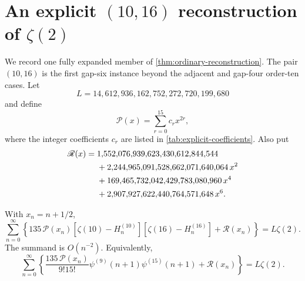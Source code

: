 \section{An explicit \texorpdfstring{$(10,16)$}{(10,16)} reconstruction of \texorpdfstring{$\zeta(2)$}{zeta(2)}}
\label{sec:explicit-identity}

We record one fully expanded member of
\cref{thm:ordinary-reconstruction}.  The pair $(10,16)$ is the first
gap-six instance beyond the adjacent and gap-four order-ten cases.  Let
\begin{equation}
 L=14{,}612{,}936{,}162{,}752{,}272{,}720{,}199{,}680
 \label{eq:explicit-L}
\end{equation}
and define
\begin{equation}
 \mathscr P(x)=\sum_{r=0}^{15}c_rx^{2r},
 \label{eq:explicit-P}
\end{equation}
where the integer coefficients $c_r$ are listed in
\cref{tab:explicit-coefficients}.  Also put
\begin{align}
 \mathscr R(x)={}&
 1{,}552{,}076{,}939{,}623{,}430{,}612{,}844{,}544
 \notag\\
 &+2{,}244{,}965{,}091{,}528{,}662{,}071{,}640{,}064\,x^2
 \notag\\
 &+169{,}465{,}732{,}042{,}429{,}783{,}080{,}960\,x^4
 \notag\\
 &+2{,}907{,}927{,}622{,}440{,}764{,}571{,}648\,x^6.
 \label{eq:explicit-R}
\end{align}

\begin{theorem}
\label{thm:explicit-1016}
With $x_n=n+1/2$,
\begin{equation}
 \boxed{\displaystyle
 \sum_{n=0}^{\infty}
 \left\{
 135\,\mathscr P(x_n)
 [\zeta(10)-H_n^{(10)}][\zeta(16)-H_n^{(16)}]
 +\mathscr R(x_n)
 \right\}=L\zeta(2).}
 \label{eq:explicit-1016}
\end{equation}
The summand is $O(n^{-2})$.  Equivalently,
\begin{equation}
 \sum_{n=0}^{\infty}
 \left\{
 \frac{135\,\mathscr P(x_n)}{9!15!}
 \psi^{(9)}(n+1)\psi^{(15)}(n+1)
 +\mathscr R(x_n)
 \right\}=L\zeta(2).
 \label{eq:explicit-1016-polygamma}
\end{equation}
\end{theorem}

